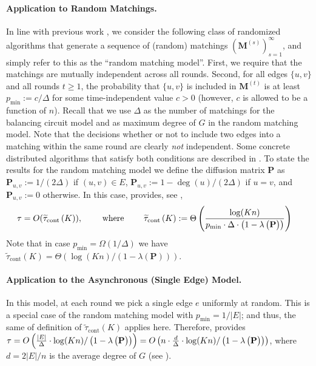 \documentclass[twoside,leqno]{article}
\newcommand{\M}{\mathbf{M}}
\renewcommand{\P}{\mathbf{P}}
\DeclareMathOperator{\1}{\mathbf{1}}
\newcommand{\tauspectral}[1]{{\widetilde{\tau}}_{\mathrm{cont}}\left({#1}\right)}
\numberwithin{equation}{section}
\begin{document}
\paragraph{Application to Random Matchings.}
In line with previous work \cite{DBLP:journals/jcss/GhoshM96,DBLP:journals/tit/BoydGPS06,DBLP:conf/focs/SauerwaldS12}, we consider the following class of randomized algorithms that generate a sequence of (random) matchings $\left(\M^{(s)}\right)_{s=1}^{\infty}$, and simply refer to this as the ``random matching model''. First, we require that the matchings are mutually independent across all rounds. Second, for all edges $\{u,v\}$ and all rounds $t \geq 1$, the probability that $\{u,v\}$ is included in $\M^{(t)}$ is at least $p_{\min}:=c/\Delta$ for some time-independent value $c>0$ (however, $c$ is allowed to be a function of $n$). Recall that we use $\Delta$ as the number of matchings for the balancing circuit model and as maximum degree of $G$ in the random matching model.
Note that the decisions whether or not to include two edges into a matching within the same round are clearly \emph{not} independent.
Some concrete distributed algorithms that satisfy both conditions are described in \cite{DBLP:journals/jcss/GhoshM96,DBLP:journals/tit/BoydGPS06}. 
To state the results for the random matching model we 
define the diffusion matrix $\P$  as $\P_{u,v}:=1/(2\Delta)$ if $(u,v)\in E$, $\P_{u,v}:=1-\operatorname{deg}(u)/(2\Delta)$ if $u=v$, and $\P_{u,v}:=0$ otherwise.
In this case,  provides, see ,
\begin{align}
 \tau &= O(\tauspectral{K}), \qquad \mbox{ where } \qquad \tauspectral{K} :=
 \Theta \left(\frac{\log(Kn)}{p_{\min}\cdot \Delta \cdot\left(1-\lambda\left(\vphantom{X^1}\P\right)\right)}\right)  \label{eq:matching_spectral}
 \end{align}
 Note that in case $p_{\min}=\Omega(1/\Delta)$ we have 
$\tauspectral{K} =\Theta \left( \log(Kn)/(1-\lambda(\P)) \right)$.

\paragraph{Application to the Asynchronous (Single Edge) Model.} 
 In this model, at each round we pick a single edge $e$ uniformly at random. This is a special case of the random matching model with $p_{\min} = 1/|E|$; and thus, the same of definition of $\tauspectral{K}$ applies here. Therefore,  provides $\tau =O\left(\frac{|E|}{\Delta}\cdot\log(Kn)/\left(1-\lambda\left(\vphantom{X^1}\P\right)\right)\right)
 =O\left( n \cdot \frac{d}{\Delta} \cdot \log(Kn)/\left(1-\lambda\left(\vphantom{X^1}\P\right)\right)\right)
 $, where $d=2|E|/n$ is the average degree of $G$ (see ).
\end{document}
